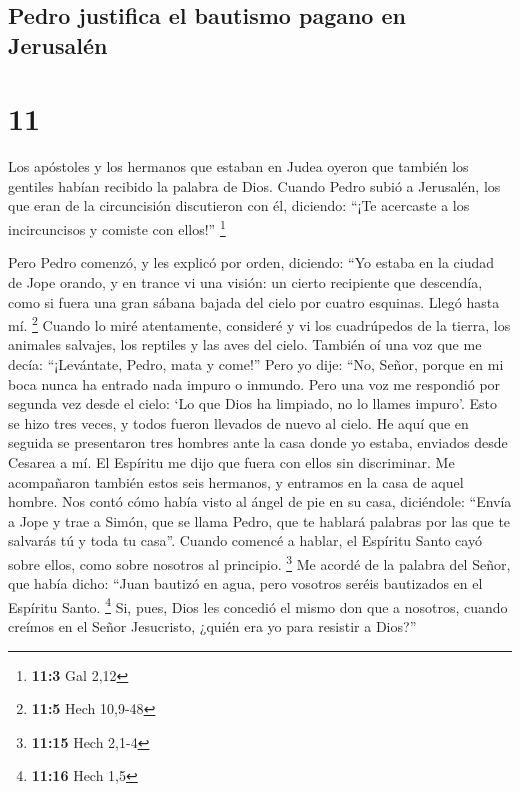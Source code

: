 \hypertarget{pedro-justifica-el-bautismo-pagano-en-jerusaluxe9n}{%
\subsection{Pedro justifica el bautismo pagano en
Jerusalén}\label{pedro-justifica-el-bautismo-pagano-en-jerusaluxe9n}}

\hypertarget{section-10}{%
\section{11}\label{section-10}}

 Los apóstoles y los hermanos que estaban en Judea oyeron
que también los gentiles habían recibido la palabra de Dios.
 Cuando Pedro subió a Jerusalén, los que eran de la
circuncisión discutieron con él,  diciendo: ``¡Te
acercaste a los incircuncisos y comiste con ellos!'' \footnote{\textbf{11:3}
  Gal 2,12}

 Pero Pedro comenzó, y les explicó por orden, diciendo:
 ``Yo estaba en la ciudad de Jope orando, y en trance vi
una visión: un cierto recipiente que descendía, como si fuera una gran
sábana bajada del cielo por cuatro esquinas. Llegó hasta mí. \footnote{\textbf{11:5}
  Hech 10,9-48}  Cuando lo miré atentamente, consideré y
vi los cuadrúpedos de la tierra, los animales salvajes, los reptiles y
las aves del cielo.  También oí una voz que me decía:
``¡Levántate, Pedro, mata y come!''  Pero yo dije: ``No,
Señor, porque en mi boca nunca ha entrado nada impuro o inmundo.
 Pero una voz me respondió por segunda vez desde el cielo:
`Lo que Dios ha limpiado, no lo llames impuro'.  Esto se
hizo tres veces, y todos fueron llevados de nuevo al cielo.
 He aquí que en seguida se presentaron tres hombres ante
la casa donde yo estaba, enviados desde Cesarea a mí.  El
Espíritu me dijo que fuera con ellos sin discriminar. Me acompañaron
también estos seis hermanos, y entramos en la casa de aquel hombre.
 Nos contó cómo había visto al ángel de pie en su casa,
diciéndole: ``Envía a Jope y trae a Simón, que se llama Pedro,
 que te hablará palabras por las que te salvarás tú y
toda tu casa''.  Cuando comencé a hablar, el Espíritu
Santo cayó sobre ellos, como sobre nosotros al principio. \footnote{\textbf{11:15}
  Hech 2,1-4}  Me acordé de la palabra del Señor, que
había dicho: ``Juan bautizó en agua, pero vosotros seréis bautizados en
el Espíritu Santo. \footnote{\textbf{11:16} Hech 1,5} 
Si, pues, Dios les concedió el mismo don que a nosotros, cuando creímos
en el Señor Jesucristo, ¿quién era yo para resistir a Dios?''

